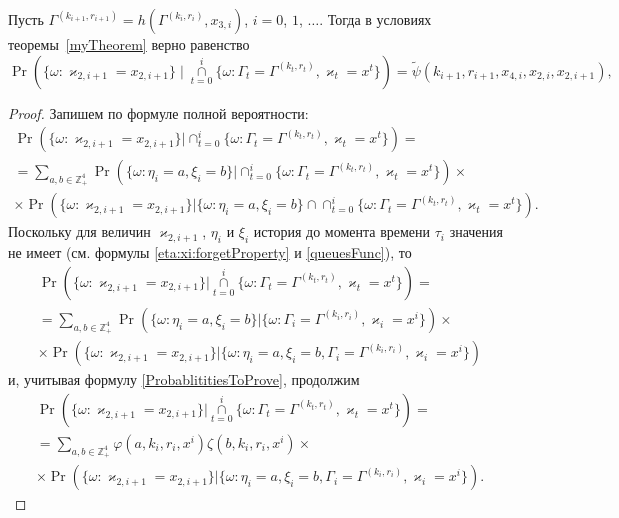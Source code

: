 \documentclass{report}
\begin{document}
\begin{corollary}
Пусть $\Gamma^{(k_{i+1},r_{i+1})}=h(\Gamma^{(k_i,r_i)},x_{3,i})$, $i=0$, $1$, $\ldots$. Тогда в условиях теоремы~\ref{myTheorem} верно равенство
\begin{equation}
\Pr (\{ \omega \colon \varkappa_{2,i+1} = x_{2,i+1}\} \mid\mathop{\cap}\limits_{t=0}^{i}\{\omega\colon \Gamma_t=\Gamma^{(k_t,r_t)}, \varkappa_t=x^t\})=\widetilde{\psi}(k_{i+1},r_{i+1},x_{4,i},x_{2,i},x_{2,i+1}),
\label{kappa:2:conditional}
\end{equation}
\end{corollary}
\begin{proof}
Запишем по формуле полной вероятности:
\begin{multline*}
\Pr (\{ \omega \colon \varkappa_{2,i+1} = x_{2,i+1}\} |\cap_{t=0}^{i}\{\omega\colon \Gamma_t=\Gamma^{(k_t,r_t)}, \varkappa_t=x^t\}) = \\
= \sum_{a,b\in \mathbb{Z}_+^4} \Pr (\{ \omega \colon \eta_i=a, \xi_i=b\} |\cap_{t=0}^{i}\{\omega\colon \Gamma_t=\Gamma^{(k_t,r_t)}, \varkappa_t=x^t\}) \times \\
\times \Pr (\{ \omega \colon \varkappa_{2,i+1} = x_{2,i+1}\} |\{\omega\colon \eta_i=a, \xi_i=b\}\cap \cap_{t=0}^{i}\{\omega\colon \Gamma_t=\Gamma^{(k_t,r_t)}, \varkappa_t=x^t\}).
\end{multline*}
Поскольку для величин $\varkappa_{2,i+1}$, $\eta_i$ и $\xi_i$ история до момента времени $\tau_i$ значения не имеет (см. формулы \eqref{eta:xi:forgetProperty} и \eqref{queuesFunc}), то
\begin{multline*}
\Pr (\{ \omega \colon \varkappa_{2,i+1} = x_{2,i+1}\} |\mathop{\cap}\limits_{t=0}^{i}\{\omega\colon \Gamma_t=\Gamma^{(k_t,r_t)}, \varkappa_t=x^t\}) = \\
=\sum_{a,b\in \mathbb{Z}_+^4} \Pr (\{ \omega \colon \eta_i=a, \xi_i=b\} |\{\omega\colon \Gamma_i=\Gamma^{(k_i,r_i)}, \varkappa_i=x^i\}) \times \\
\times \Pr (\{ \omega \colon \varkappa_{2,i+1} = x_{2,i+1}\} |\{\omega\colon \eta_i=a, \xi_i=b, \Gamma_i=\Gamma^{(k_i,r_i)}, \varkappa_i=x^i\}) 
\end{multline*}
и, учитывая формулу \eqref{ProbablititiesToProve}, продолжим
\begin{multline*}
\Pr (\{ \omega \colon \varkappa_{2,i+1} = x_{2,i+1}\} |\mathop{\cap}\limits_{t=0}^{i}\{\omega\colon \Gamma_t=\Gamma^{(k_t,r_t)}, \varkappa_t=x^t\}) =\\
=\sum_{a,b\in \mathbb{Z}_+^4} \varphi(a,k_i,r_i,x^i)\zeta(b,k_i,r_i,x^i) \times\\
\times \Pr (\{ \omega \colon \varkappa_{2,i+1} = x_{2,i+1}\} |\{\omega\colon \eta_i=a, \xi_i=b, \Gamma_i=\Gamma^{(k_i,r_i)}, \varkappa_i=x^i\}).
\end{multline*}


\end{proof}
\end{document}
